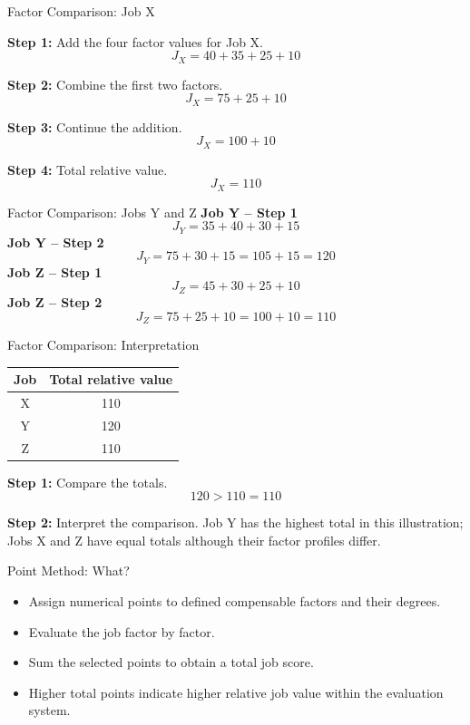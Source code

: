 \documentclass[aspectratio=169,10pt]{beamer}
\begin{document}
\begin{frame}{Factor Comparison: Job X}
\small
\par\textbf{Step 1:} Add the four factor values for Job X.
\[
J_X=40+35+25+10
\]
\pause
\par\textbf{Step 2:} Combine the first two factors.
\[
J_X=75+25+10
\]
\pause
\par\textbf{Step 3:} Continue the addition.
\[
J_X=100+10
\]
\pause
\par\textbf{Step 4:} Total relative value.
\[
\boxed{J_X=110}
\]
\end{frame}

\begin{frame}{Factor Comparison: Jobs Y and Z}
\small
\textbf{Job Y -- Step 1}
\[
J_Y=35+40+30+15
\]
\pause
\textbf{Job Y -- Step 2}
\[
J_Y=75+30+15=105+15=\boxed{120}
\]
\pause
\textbf{Job Z -- Step 1}
\[
J_Z=45+30+25+10
\]
\pause
\textbf{Job Z -- Step 2}
\[
J_Z=75+25+10=100+10=\boxed{110}
\]
\end{frame}

\begin{frame}{Factor Comparison: Interpretation}
\small
\begin{center}
\begin{tabular}{c|c}
\toprule Job & Total relative value\\\midrule
X&110\\Y&120\\Z&110\\\bottomrule
\end{tabular}
\end{center}
\vspace{0.18cm}
\par\textbf{Step 1:} Compare the totals.
\[
120>110=110
\]
\pause
\par\textbf{Step 2:} Interpret the comparison.
Job Y has the highest total in this illustration; Jobs X and Z have equal totals although their factor profiles differ.
\end{frame}

\begin{frame}{Point Method: What?}
\begin{itemize}
  \item Assign numerical points to defined compensable factors and their degrees.
  \item Evaluate the job factor by factor.
  \item Sum the selected points to obtain a total job score.
  \item Higher total points indicate higher relative job value within the evaluation system.
\end{itemize}
\end{frame}
\end{document}
